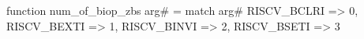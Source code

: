 function num_of_biop_zbs arg# = match arg# {
  RISCV_BCLRI => 0,
  RISCV_BEXTI => 1,
  RISCV_BINVI => 2,
  RISCV_BSETI => 3
}
